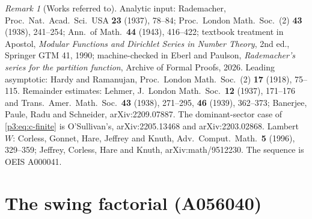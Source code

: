 \documentclass[11pt,a4paper,oneside]{book}
\theoremstyle{plain}
\theoremstyle{definition}
\theoremstyle{remark}
\newtheorem{remark}[theorem]{Remark}
\begin{document}
\begin{remark}[Works referred to]\label{p3:rem:references}
Analytic input: Rademacher, Proc.\ Nat.\ Acad.\ Sci.\ USA \textbf{23} (1937), 78--84; Proc.\
London Math.\ Soc.\ (2) \textbf{43} (1938), 241--254; Ann.\ of Math.\ \textbf{44} (1943),
416--422; textbook treatment in Apostol, \emph{Modular Functions and Dirichlet Series in Number
Theory}, 2nd ed., Springer GTM 41, 1990; machine-checked in Eberl and Paulson, \emph{Rademacher's
series for the partition function}, Archive of Formal Proofs, 2026. Leading asymptotic: Hardy and
Ramanujan, Proc.\ London Math.\ Soc.\ (2) \textbf{17} (1918), 75--115. Remainder estimates:
Lehmer, J.\ London Math.\ Soc.\ \textbf{12} (1937), 171--176 and Trans.\ Amer.\ Math.\ Soc.\
\textbf{43} (1938), 271--295, \textbf{46} (1939), 362--373; Banerjee, Paule, Radu and Schneider,
arXiv:2209.07887. The dominant-sector case of \cref{p3:eq:c-finite} is O'Sullivan's,
arXiv:2205.13468 and arXiv:2203.02868. Lambert $W$: Corless, Gonnet, Hare, Jeffrey and Knuth,
Adv.\ Comput.\ Math.\ \textbf{5} (1996), 329--359; Jeffrey, Corless, Hare and Knuth,
arXiv:math/9512230. The sequence is OEIS A000041.
\end{remark}

\chapter{The swing factorial (A056040)}
\label{p4:sec:top}
\end{document}
